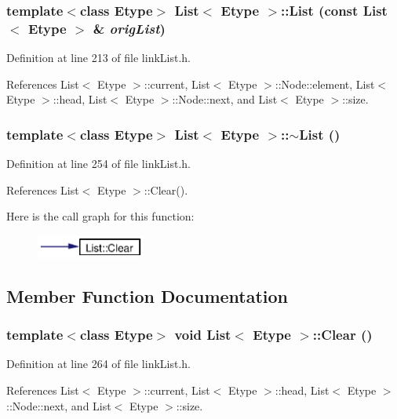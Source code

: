 \subsubsection{\setlength{\rightskip}{0pt plus 5cm}template$<$class Etype$>$ {\bf List}$<$ Etype $>$::{\bf List} (const {\bf List}$<$ Etype $>$ \& {\em orig\-List})}\label{classList_a2}




Definition at line 213 of file link\-List.h.

References List$<$ Etype $>$::current, List$<$ Etype $>$::Node::element, List$<$ Etype $>$::head, List$<$ Etype $>$::Node::next, and List$<$ Etype $>$::size.
\subsubsection{\setlength{\rightskip}{0pt plus 5cm}template$<$class Etype$>$ {\bf List}$<$ Etype $>$::$\sim${\bf List} ()}\label{classList_a3}




Definition at line 254 of file link\-List.h.

References List$<$ Etype $>$::Clear().

Here is the call graph for this function:\begin{figure}[H]
\begin{center}
\leavevmode
\includegraphics[width=101pt]{classList_a3_cgraph}
\end{center}
\end{figure}


\subsection{Member Function Documentation}
\subsubsection{\setlength{\rightskip}{0pt plus 5cm}template$<$class Etype$>$ void {\bf List}$<$ Etype $>$::Clear ()}\label{classList_a4}




Definition at line 264 of file link\-List.h.

References List$<$ Etype $>$::current, List$<$ Etype $>$::head, List$<$ Etype $>$::Node::next, and List$<$ Etype $>$::size.

